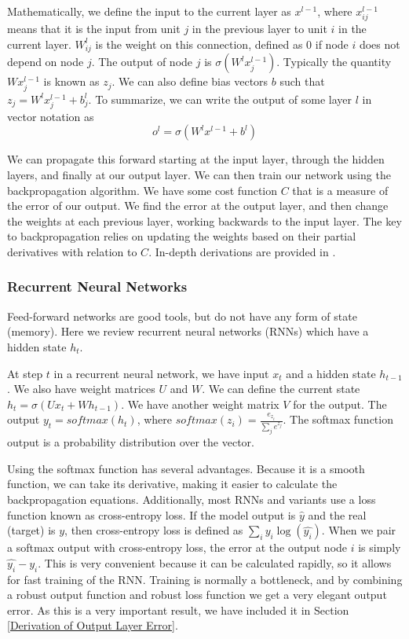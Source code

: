 \documentclass[pageno]{jpaper}
\begin{document}
Mathematically, we define the input to the current layer as $x^{l-1}$,
where $x^{l-1}_{ij}$ means that it is the input from unit $j$ in the previous
layer to unit $i$ in the current layer. $W^l_{ij}$ is the weight on this
connection, defined as 0 if node $i$ does not depend on node $j$. The output of
node $j$ is $\sigma ( W^l x^{l-1}_j)$. Typically the quantity $Wx^{l-1}_j$ is
known as $z_j$. We can also define bias vectors $b$ such that $z_j =
W^lx^{l-1}_j + b^l_j$. To summarize, we can write the output of some layer $l$
in vector notation as
$$o^l = \sigma(W^lx^{l-1} + b^l)$$

We can propagate this forward starting at the input layer, through the hidden
layers, and finally at our output layer. We can then train our network using the
backpropagation algorithm. We have some cost function $C$ that is a measure of
the error of our output. We find the error at the output layer, and then change
the weights at each previous layer, working backwards to the input layer. The
key to backpropagation relies on updating the weights based on their partial
derivatives with relation to $C$. In-depth derivations are provided in
\cite{Bishop1995, Nielsen2015}.\\

\subsubsection{Recurrent Neural Networks}
\label{Recurrent Neural Networks}

Feed-forward networks are good tools, but do not have any form of state
(memory). Here we review recurrent neural networks (RNNs) which have a hidden
state $h_t$.

At step $t$ in a recurrent neural network, we have input $x_t$ and a hidden
state $h_{t-1}$. We also have weight matrices $U$ and $W$. We can define the
current state $h_t = \sigma(Ux_t + Wh_{t-1})$. We have another weight matrix $V$
for the output. The output $y_t = softmax(h_t)$, where $softmax(z_i) =
\frac{e_{z_i}}{\sum_j e^{z_j}}$. The softmax function output is a probability
distribution over the vector.

Using the softmax function has several advantages. Because it is a smooth
function, we can take its derivative, making it easier to calculate the
backpropagation equations. Additionally, most RNNs and variants use a loss
function known as cross-entropy loss. If the model output is $\hat{y}$ and the
real (target) is $y$, then cross-entropy loss is defined as $\sum_i y_i
\log(\hat{y_{i}})$. When we pair a softmax output with cross-entropy loss, the
error at the output node $i$ is simply $\hat{y_i} - y_i$. This is very
convenient because it can be calculated rapidly, so it allows for fast training
of the RNN. Training is normally a bottleneck, and by combining a robust output
function and robust loss function we get a very elegant output error. As this is
a very important result, we have included it in Section \ref{Derivation of
Output Layer Error}.
\end{document}
